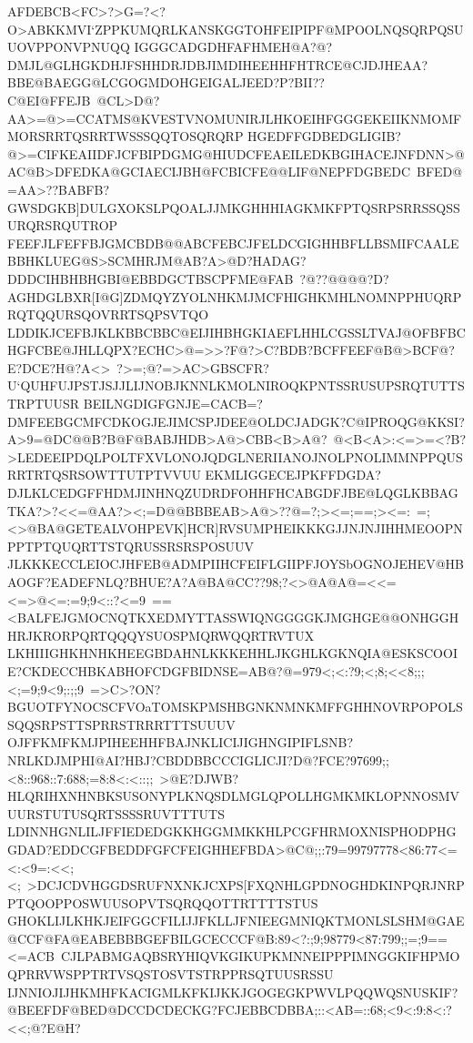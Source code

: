 {{{ AFDEBCB<FC>?>G=?<?O>ABKKMVI`ZPPKUMQRLKANSKGGTOHFEIPIPF@MPOOLNQSQRPQSUUOVPPONVPNUQQ}
 \hbox{IGGGCADGDHFAFHMEH@A?@?DMJL@GLHGKDHJFSHHDRJDBJIMDIHEEHHFHTRCE@CJDJHEAA?BBE@BAEGG@LCGOGMDOHGEIGALJEED?P?BII??C@EI@FFEJB%
 @CL>D@?AA>=@>=CCATMS@KVESTVNOMUNIRJLHKOEIHFGGGEKEIIKNMOMFMORSRRTQSRRTWSSSQQTOSQRQRP}
 \hbox{HGEDFFGDBEDGLIGIB?@>=CIFKEAIIDFJCFBIPDGMG@HIUDCFEAEILEDKBGIHACEJNFDNN>@AC@B>DFEDKA@GCIAECIJBH@FCBICFE@@LIF@NEPFDGBEDC%
 BFED@=AA>??BABFB?GWSDGKB]DULGXOKSLPQOALJJMKGHHHIAGKMKFPTQSRPSRRSSQSSURQRSRQUTROP}
 \hbox{FEEFJLFEFFBJGMCBDB@@ABCFEBCJFELDCGIGHHBFLLBSMIFCAALEBBHKLUEG@S>SCMHRJM@AB?A>@D?HADAG?DDDCIHBHBHGBI@EBBDGCTBSCPFME@FAB%
 ?@??@@@@?D?AGHDGLBXR[I@G]ZDMQYZYOLNHKMJMCFHIGHKMHLNOMNPPHUQRPRQTQQURSQOVRRTSQPSVTQO}
 \hbox{LDDIKJCEFBJKLKBBCBBC@EIJIHBHGKIAEFLHHLCGSSLTVAJ@OFBFBCHGFCBE@JHLLQPX?ECHC>@=>>?F@?>C?BDB?BCFFEEF@B@>BCF@?E?DCE?H@?A<>%
 ?>=;@?=>AC>GBSCFR?U`QUHFUJPSTJSJJLIJNOBJKNNLKMOLNIROQKPNTSSRUSUPSRQTUTTSTRPTUUSR}
 \hbox{BEILNGDIGFGNJE=CACB=?DMFEEBGCMFCDKOGJEJIMCSPJDEE@OLDCJADGK?C@IPROQG@KKSI?A>9=@DC@@B?B@F@BABJHDB>A@>CBB<B>A@?%
 @<B<A>:<=>=<?B?>LEDEEIPDQLPOLTFXVLONOJQDGLNERIIANOJNOLPNOLIMMNPPQUSRRTRTQSRSOWTTUTPTVVUU}
 \hbox{EKMLIGGECEJPKFFDGDA?DJLKLCEDGFFHDMJINHNQZUDRDFOHHFHCABGDFJBE@LQGLKBBAGTKA?>?<<=@AA?><;=D@@BBBEAB>A@>??@=?;><=;==;><=:%
 =;<>@BA@GETEALVOHPEVK]HCR]RVSUMPHEIKKKGJJNJNJIHHMEOOPNPPTPTQUQRTTSTQRUSSRSRSPOSUUV}
 \hbox{JLKKKECCLEIOCJHFEB@ADMPIIHCFEIFLGIIPFJOYSbOGNOJEHEV@HBAOGF?EADEFNLQ?BHUE?A?A@BA@CC??98;?<>@A@A@=<<=<=>@<=:=9;9<::?<=9%
 ==<BALFEJGMOCNQTKXEDMYTTASSWIQNGGGGKJMGHGE@@ONHGGHHRJKRORPQRTQQQYSUOSPMQRWQQRTRVTUX}
 \hbox{LKHIIIGHKHNHKHEEGBDAHNLKKKEHHLJKGHLKGKNQIA@ESKSCOOIE?CKDECCHBKABHOFCDGFBIDNSE=AB@?@=979<;<:?9;<;8;<<8;;;<;=9;9<9;:;;9%
 =>C>?ON?BGUOTFYNOCSCFVOaTOMSKPMSHBGNKNMNKMFFGHHNOVRPOPOLSSQQSRPSTTSPRRSTRRRTTTSUUUV}
 \hbox{OJFFKMFKMJPIHEEHHFBAJNKLICIJIGHNGIPIFLSNB?NRLKDJMPHI@AI?HBJ?CBDDBBCCCIGLICJI?D@?FCE?97699;;<8::968::7:688;=8:8<:<::;;%
 >@E?DJWB?HLQRIHXNHNBKSUSONYPLKNQSDLMGLQPOLLHGMKMKLOPNNOSMVUURSTUTUSQRTSSSSRUVTTTUTS}
 \hbox{LDINNHGNLILJFFIEDEDGKKHGGMMKKHLPCGFHRMOXNISPHODPHGGDAD?EDDCGFBEDDFGFCFEIGHHEFBDA>@C@;;:79=99797778<86:77<=<:<9=:<<;<;%
 >DCJCDVHGGDSRUFNXNKJCXPS[FXQNHLGPDNOGHDKINPQRJNRPPTQOOPPOSWUUSOPVTSQRQQOTTRTTTTSTUS}
 \hbox{GHOKLIJLKHKJEIFGGCFILIJJFKLLJFNIEEGMNIQKTMONLSLSHM@GAE@CCF@FA@EABEBBBGEFBILGCECCCF@B:89<?:;9;98779<87:799;;=;9==<=ACB%
 CJLPABMGAQBSRYHIQVKGIKUPKMNNEIPPPIMNGGKIFHPMOQPRRVWSPPTRTVSQSTOSVTSTRPPRSQTUUSRSSU}
 \hbox{IJNNIOJIJHKMHFKACIGMLKFKIJKKJGOGEGKPWVLPQQWQSNUSKIF?@BEEFDF@BED@DCCDCDECKG?FCJEBBCDBBA;::<AB=::68;<9<:9:8<:?<<;@?E@H?%
}}}
